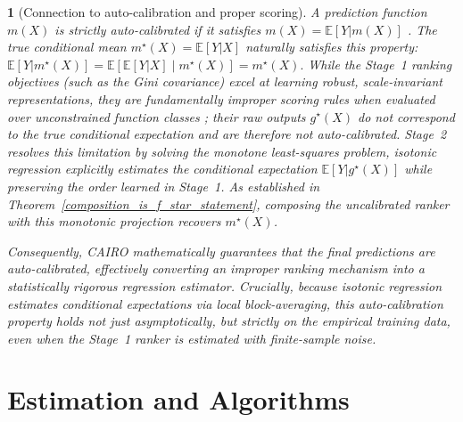 \documentclass[11pt]{article}
\theoremstyle{plain}
\newtheorem{remark}{\protect\remarkname}
\theoremstyle{plain}
\theoremstyle{plain}
\theoremstyle{plain}
\theoremstyle{plain}
\theoremstyle{plain}
\theoremstyle{plain}
\providecommand{\remarkname}{Remark}
\begin{document}
\begin{remark}[Connection to auto-calibration and proper scoring]
\label{rmk:auto_calibration}
A prediction function $m(X)$ is strictly auto-calibrated if it satisfies $m(X) = \mathbb{E}[Y | m(X)]$ \citep{kruger2021generic, gneiting2023regression}. The true conditional mean $m^\star(X) = \mathbb{E}[Y|X]$ naturally satisfies this property:
$
\mathbb{E}[Y | m^\star(X)] = \mathbb{E}[\mathbb{E}[Y | X] \mid m^\star(X)] = m^\star(X).
$
While the Stage~1 ranking objectives (such as the Gini covariance) excel at learning robust, scale-invariant representations, they are fundamentally improper scoring rules when evaluated over unconstrained function classes \citep{wuthrich2023model}; their raw outputs $g^\star(X)$ do not correspond to the true conditional expectation and are therefore not auto-calibrated.  Stage~2 resolves this  limitation by solving the monotone least-squares problem, isotonic regression explicitly estimates the conditional expectation $\mathbb{E}[Y | g^\star(X)]$ while preserving the order learned in Stage~1. As established in Theorem~\ref{composition_is_f_star_statement}, composing the uncalibrated ranker with this monotonic projection recovers $m^\star(X)$. 

Consequently, \textsc{CAIRO} mathematically guarantees that the final predictions are auto-calibrated, effectively converting an improper ranking mechanism into a statistically rigorous regression estimator. Crucially, because isotonic regression estimates conditional expectations via local block-averaging, this auto-calibration property holds not just asymptotically, but strictly on the empirical training data, even when the Stage~1 ranker is estimated with finite-sample noise.
\end{remark}




\section{Estimation and Algorithms}
\end{document}
